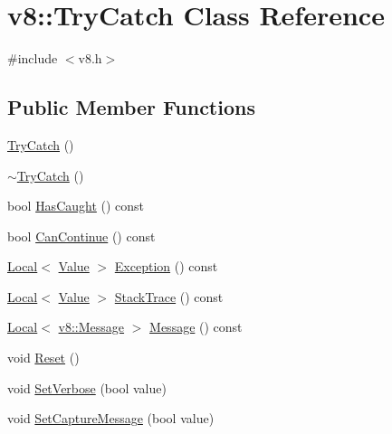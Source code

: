 \hypertarget{classv8_1_1_try_catch}{}\section{v8\+:\+:Try\+Catch Class Reference}
\label{classv8_1_1_try_catch}


{\ttfamily \#include $<$v8.\+h$>$}

\subsection*{Public Member Functions}
\begin{DoxyCompactItemize}
\item 
\hyperlink{classv8_1_1_try_catch_adc9b1b11e73b0325df727914c348053d}{Try\+Catch} ()
\item 
\hyperlink{classv8_1_1_try_catch_a2c9ad4b40d17dd31c6dd020736b30679}{$\sim$\+Try\+Catch} ()
\item 
bool \hyperlink{classv8_1_1_try_catch_a48f704fbf2b82564b5d2a4ff596e4137}{Has\+Caught} () const 
\item 
bool \hyperlink{classv8_1_1_try_catch_a2ec467d4653d26c064d749cab98791cb}{Can\+Continue} () const 
\item 
\hyperlink{classv8_1_1_local}{Local}$<$ \hyperlink{classv8_1_1_value}{Value} $>$ \hyperlink{classv8_1_1_try_catch_a99c425f29b3355b4294cbe762377f99b}{Exception} () const 
\item 
\hyperlink{classv8_1_1_local}{Local}$<$ \hyperlink{classv8_1_1_value}{Value} $>$ \hyperlink{classv8_1_1_try_catch_a1ee3e6ee74a4fc50185443ccdc4d3ae7}{Stack\+Trace} () const 
\item 
\hyperlink{classv8_1_1_local}{Local}$<$ \hyperlink{classv8_1_1_message}{v8\+::\+Message} $>$ \hyperlink{classv8_1_1_try_catch_a2811e500fbb906ee505895a3d94fc66f}{Message} () const 
\item 
void \hyperlink{classv8_1_1_try_catch_a3aae8acab4c99b374b7d782763d4c8e1}{Reset} ()
\item 
void \hyperlink{classv8_1_1_try_catch_a032cd889d76bd596e2616df11ced8682}{Set\+Verbose} (bool value)
\item 
void \hyperlink{classv8_1_1_try_catch_a541b8fa6951bd5a439692c22d5c7b73c}{Set\+Capture\+Message} (bool value)
\end{DoxyCompactItemize}
